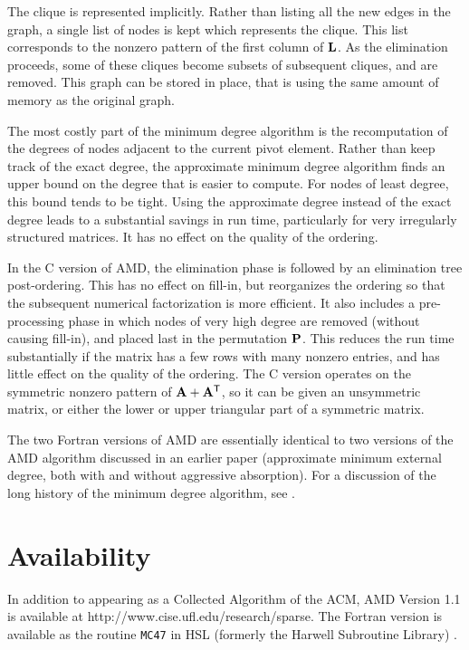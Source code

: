 \documentclass[11pt]{article}
\newcommand{\m}[1]{{\bf{#1}}}       %
\newcommand{\tr}{^{\sf T}}          %
\begin{document}
The clique is represented implicitly.  Rather than listing all the
new edges in the graph, a single list of nodes is kept which represents
the clique.  This list corresponds to the nonzero pattern of the first
column of $\m{L}$.  As the elimination proceeds, some of these cliques
become subsets of subsequent cliques, and are removed.   This graph
can be stored in place, that is
using the same amount of memory as the original graph.

The most costly part of the minimum degree algorithm is the recomputation
of the degrees of nodes adjacent to the current pivot element.
Rather than keep track of the exact degree, the approximate minimum degree
algorithm finds an upper bound on the degree that is easier to compute.
For nodes of least degree, this bound tends to be tight.  Using the
approximate degree instead of the exact degree leads to a substantial savings
in run time, particularly for very irregularly structured matrices.
It has no effect on the quality of the ordering.

In the C version of AMD, the elimination phase is followed by an
elimination tree post-ordering.  This has no effect on fill-in, but
reorganizes the ordering so that the subsequent numerical factorization is
more efficient.  It also includes a pre-processing phase in which nodes of
very high degree are removed (without causing fill-in), and placed last in the
permutation $\m{P}$.  This reduces the run time substantially if the matrix
has a few rows with many nonzero entries, and has little effect on the quality
of the ordering.
The C version operates on the
symmetric nonzero pattern of $\m{A}+\m{A}\tr$, so it can be given
an unsymmetric matrix, or either the lower or upper triangular part of
a symmetric matrix.

The two Fortran versions of AMD are essentially identical to two versions of
the AMD algorithm discussed in an earlier paper \cite{AmestoyDavisDuff96}
(approximate minimum external degree, both with and without aggressive
absorption).
For a discussion of the long history of the minimum degree algorithm,
see \cite{GeorgeLiu89}.

\section{Availability}

In addition to appearing as a Collected Algorithm of the ACM,
AMD Version 1.1 is available at http://www.cise.ufl.edu/research/sparse.
The Fortran version is available as the routine {\tt MC47} in HSL
(formerly the Harwell Subroutine Library) \cite{hsl:2002}.
\end{document}

